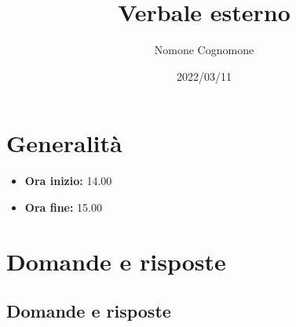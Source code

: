 \documentclass{classes/base}
\title{Verbale esterno}
\date{2022/03/11}
\author{Nomone Cognomone}
\renewcommand{\maketitle}{
    
}
\begin{document}
    \maketitle

    \section{Generalità}
    \begin{itemize}
        \item \textbf{Ora inizio:} 14.00
        \item \textbf{Ora fine:} 15.00
    \end{itemize}

    \section{Domande e risposte}
    \subsection*{Domande e risposte}
    
\end{document}
